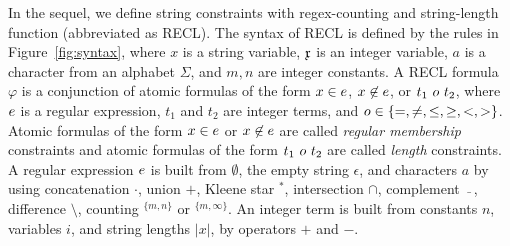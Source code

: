 %

In the sequel, we define string constraints with regex-counting and string-length function (abbreviated as RECL). The syntax of RECL is defined by the rules in Figure~\ref{fig:syntax}, where $x$ is a string variable, $\mathfrak{x}$ is an integer variable, $a$ is a character from an alphabet $\Sigma$, and $m, n$ are integer constants. 
A RECL formula $\varphi$ is a conjunction of atomic formulas of the form $x \in e$, $x \not \in e$, or $t_1\ \op\ t_2$, where $e$ is a regular expression,  
$t_1$ and $t_2$ are integer terms, and $o \in \{=, \neq, \le, \ge, <, >\}$. Atomic formulas of the form $x \in e$ or $x \not \in e$ are called \emph{regular membership} constraints and atomic formulas of the form $t_1\ \op\ t_2$ are called \emph{length} constraints. 
%
A regular expression $e$ is built from $\emptyset$, the empty string $\epsilon$, and characters $a$ by using concatenation  $\cdot$, union $+$, Kleene star $^*$, intersection $\cap$, complement $\bar{\mbox{ }}$, difference $\setminus$, counting $^{\{m,n\}}$ or $^{\{m,\infty\}}$. An integer term is built from constants $n$, variables $i$, and string lengths $|x|$, by operators $+$ and $-$.
% 
